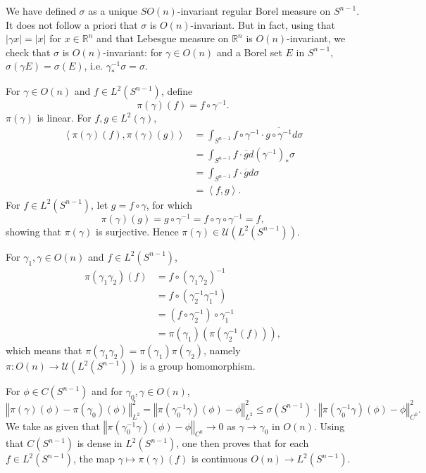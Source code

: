\documentclass{article}
\newcommand{\inner}[2]{\left\langle #1, #2 \right\rangle}
\newcommand{\norm}[1]{\left\Vert #1 \right\Vert}
\theoremstyle{definition}
\theoremstyle{definition}
\begin{document}
We have defined $\sigma$ as a unique $SO(n)$-invariant regular Borel measure on $S^{n-1}$.
It does not follow a priori that $\sigma$ is $O(n)$-invariant. But in fact, using that
$|\gamma x|=|x|$ for $x \in \mathbb{R}^n$ and that Lebesgue measure on $\mathbb{R}^n$ is $O(n)$-invariant,
we check that
 $\sigma$ is $O(n)$-invariant:
for $\gamma \in O(n)$ and a Borel set $E$ in $S^{n-1}$, 
$\sigma(\gamma E)=\sigma(E)$, i.e. ${\gamma}^{-1}_* \sigma = \sigma$. 

For $\gamma \in O(n)$ and $f \in L^2(S^{n-1})$, define
\[
\pi(\gamma)(f) = f \circ \gamma^{-1}.
\]
$\pi(\gamma)$ is linear. For $f,g \in L^2(\gamma)$,
\begin{align*}
\inner{\pi(\gamma)(f)}{\pi(\gamma)(g)}&=\int_{S^{n-1}} f \circ \gamma^{-1} \cdot \overline{g \circ \gamma^{-1}} d\sigma\\
&=\int_{S^{n-1}} f \cdot \overline{g} d(\gamma^{-1})_* \sigma\\
&=\int_{S^{n-1}} f \cdot \overline{g} d\sigma\\
&=\inner{f}{g}.
\end{align*}
For $f \in L^2(S^{n-1})$, let $g = f \circ \gamma$, for which
\[
\pi(\gamma)(g) = g \circ \gamma^{-1} = f \circ \gamma \circ \gamma^{-1} = f,
\]
showing that $\pi(\gamma)$ is surjective. Hence $\pi(\gamma) \in \mathscr{U}(L^2(S^{n-1}))$.

For $\gamma_1,\gamma \in O(n)$ and $f \in L^2(S^{n-1})$,
\begin{align*}
\pi(\gamma_1 \gamma_2)(f) &= f \circ (\gamma_1 \gamma_2)^{-1}\\
&=f \circ (\gamma_2^{-1} \gamma_1^{-1})\\
&=(f \circ \gamma_2^{-1}) \circ \gamma_1^{-1}\\
&=\pi(\gamma_1)(\pi(\gamma_2^{-1}(f))),
\end{align*}
which means that $\pi(\gamma_1 \gamma_2) = \pi(\gamma_1)  \pi(\gamma_2)$, namely
$\pi:O(n) \to \mathscr{U}(L^2(S^{n-1}))$ is a group homomorphism. 

For $\phi \in C(S^{n-1})$ and for $\gamma_0,  \gamma \in O(n)$, 
\[
\norm{\pi(\gamma)(\phi)-\pi(\gamma_0)(\phi)}_{L^2}^2=\norm{\pi(\gamma_0^{-1}\gamma)(\phi) - \phi}_{L^2}^2
\leq \sigma(S^{n-1}) \cdot \norm{\pi(\gamma_0^{-1}\gamma)(\phi) - \phi}_{C^0}^2.
\]
We take as given that $\norm{\pi(\gamma_0^{-1}\gamma)(\phi) - \phi}_{C^0} \to 0$ as $\gamma \to \gamma_0$ 
in $O(n)$. 
Using that $C(S^{n-1})$ is dense in $L^2(S^{n-1})$, one then proves that for each $f \in L^2(S^{n-1})$, the map
$\gamma \mapsto \pi(\gamma)(f)$ is continuous $O(n) \to L^2(S^{n-1})$. 
\end{document}
